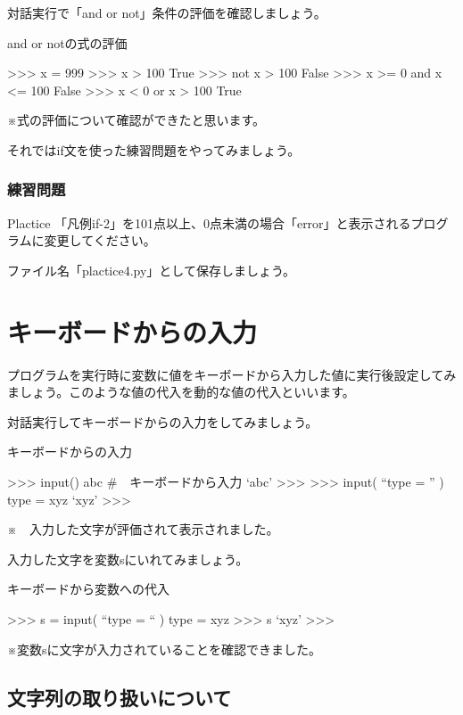 \documentclass[11pt,a4paper,dvipdfmx,titlepage]{jsreport}
\begin{document}
 {\gt 対話実行}で「and or not」条件の評価を確認しましょう。

\begin{grabox}{and or notの式の評価}
\begin{listing}{1}
>>> x = 999
>>> x > 100
True
>>> not x > 100
False
>>> x >= 0 and x <= 100
False
>>> x < 0 or x > 100
True

\end{listing}
\end{grabox}
※式の評価について確認ができたと思います。


それではif文を使った練習問題をやってみましょう。

\subsubsection{練習問題}
\begin{plabox}{Plactice}
「凡例if-2」を101点以上、0点未満の場合「error」と表示されるプログラムに変更してください。

ファイル名「plactice4.py」として保存しましょう。
\end{plabox}

\section{キーボードからの入力}
プログラムを実行時に変数に値をキーボードから入力した値に実行後設定してみましょう。このような値の代入を動的な値の代入といいます。

 {\gt 対話実行}してキーボードからの入力をしてみましょう。
\begin{grabox}{キーボードからの入力}
\begin{listing}{1}
>>> input()
abc #　キーボードから入力
‘abc’
>>>
>>> input( “type = ” )
type = xyz
‘xyz’
>>>
\end{listing}
\end{grabox}

※　入力した文字が評価されて表示されました。

入力した文字を変数sにいれてみましょう。
\begin{grabox}{キーボードから変数への代入}
\begin{listingcont}
>>> s = input( “type = “ )
type = xyz
>>> s
‘xyz’
>>>
\end{listingcont}
\end{grabox}
※変数sに文字が入力されていることを確認できました。

\subsection{文字列の取り扱いについて}
\end{document}
